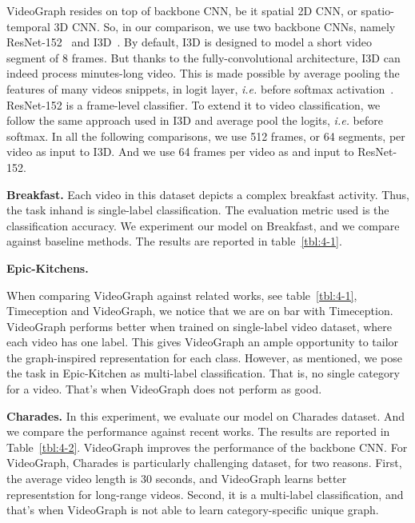 \documentclass[10pt,twocolumn,letterpaper]{article}
\def\ie{\emph{i.e.}\xspace}
\newcommand{\partitle}[1]{\noindent\textbf{#1}}
\newcommand{\ptspace}{\vspace*{5pt}}
\begin{document}
VideoGraph resides on top of backbone CNN, be it spatial 2D CNN, or spatio-temporal 3D CNN.
So, in our comparison, we use two backbone CNNs, namely ResNet-152~\cite{he2016deep} and I3D~\cite{carreira2017quo}.
By default, I3D is designed to model a short video segment of 8 frames.
But thanks to the fully-convolutional architecture, I3D can indeed process minutes-long video.
This is made possible by average pooling the features of many videos snippets, in logit layer, \ie before softmax activation~\cite{carreira2017quo}.
ResNet-152 is a frame-level classifier. To extend it to video classification, we follow the same approach used in I3D and average pool the logits, \ie before softmax.
In all the following comparisons, we use 512 frames, or 64 segments, per video as input to I3D.
And we use 64 frames per video as and input to ResNet-152.

\ptspace
\partitle{Breakfast.}
Each video in this dataset depicts a complex breakfast activity.
Thus, the task inhand is single-label classification.
The evaluation metric used is the classification accuracy.
We experiment our model on Breakfast, and we compare against baseline methods.
The results are reported in table~\ref{tbl:4-1}.

\ptspace
\partitle{Epic-Kitchens.}

When comparing VideoGraph against related works, see table~\ref{tbl:4-1}, Timeception and VideoGraph, we notice that we are on bar with Timeception.
VideoGraph performs better when trained on single-label video dataset, where each video has one label.
This gives VideoGraph an ample opportunity to tailor the graph-inspired representation for each class.
However, as mentioned, we pose the task in Epic-Kitchen as multi-label classification.
That is, no single category for a video.
That's when VideoGraph does not perform as good.

\ptspace
\partitle{Charades.}
In this experiment, we evaluate our model on Charades dataset. And we compare the performance against recent works. The results are reported in Table~\ref{tbl:4-2}. VideoGraph improves the performance of the backbone CNN. For VideoGraph, Charades is particularly challenging dataset, for two reasons.
First, the average video length is 30 seconds, and VideoGraph learns better representstion for long-range videos.
Second, it is a multi-label classification, and that's when VideoGraph is not able to learn category-specific unique graph.
\end{document}

